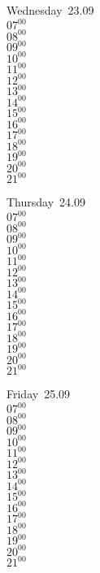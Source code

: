 \documentclass[11pt,a4paper]{book}\usepackage[]{graphicx}\usepackage[]{color}
\begin{document}
\begin{weekdaybox}
  Wednesday~23.09\\
  { 
  \vfill
  $07^{00}$\\
$08^{00}$\\
$09^{00}$\\
$10^{00}$\\
$11^{00}$\\
$12^{00}$\\
$13^{00}$\\
$14^{00}$\\
$15^{00}$\\
$16^{00}$\\
$17^{00}$\\
$18^{00}$\\
$19^{00}$\\
$20^{00}$\\
$21^{00}$\\
  }
\end{weekdaybox}
\clearpage
\begin{headerbox}
\end{headerbox}
\begin{weekdaybox}
  Thursday~24.09\\
  { 
  \vfill
  $07^{00}$\\
$08^{00}$\\
$09^{00}$\\
$10^{00}$\\
$11^{00}$\\
$12^{00}$\\
$13^{00}$\\
$14^{00}$\\
$15^{00}$\\
$16^{00}$\\
$17^{00}$\\
$18^{00}$\\
$19^{00}$\\
$20^{00}$\\
$21^{00}$\\
  }
\end{weekdaybox} 
\begin{weekdaybox}
  Friday~25.09\\
  { 
  \vfill
  $07^{00}$\\
$08^{00}$\\
$09^{00}$\\
$10^{00}$\\
$11^{00}$\\
$12^{00}$\\
$13^{00}$\\
$14^{00}$\\
$15^{00}$\\
$16^{00}$\\
$17^{00}$\\
$18^{00}$\\
$19^{00}$\\
$20^{00}$\\
$21^{00}$\\
  }
\end{weekdaybox}
\end{document}
